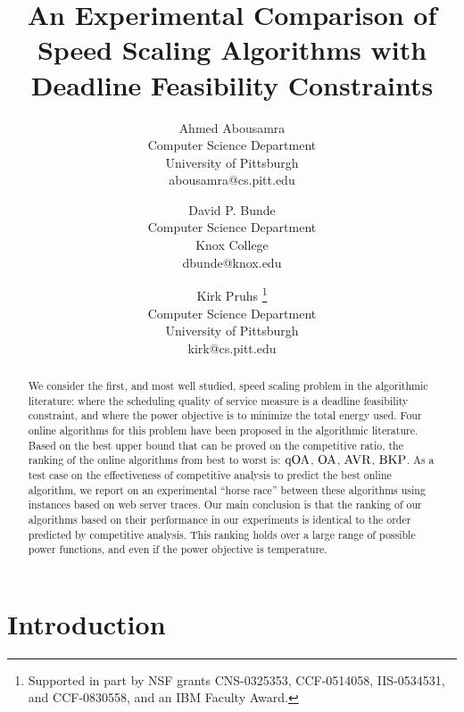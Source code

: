 \documentclass[11pt]{article}
\newcommand{\BKP}{{\rm BKP}}
\newcommand{\AVR}{{\rm AVR}}
\newcommand{\OA}{{\rm OA}}
\newcommand{\qOA}{{\rm qOA}}
\begin{document}
 

\title{An Experimental Comparison of Speed Scaling Algorithms with Deadline Feasibility Constraints}


\author{
Ahmed Abousamra\\
Computer Science Department\\
University of Pittsburgh\\
abousamra@cs.pitt.edu\\
\and
David P. Bunde\\
Computer Science Department\\
Knox College\\
dbunde@knox.edu\\
\and
Kirk Pruhs \thanks{ Supported in part by NSF grants CNS-0325353, CCF-0514058, IIS-0534531, and CCF-0830558, and an IBM Faculty Award.  } \\
Computer Science Department\\
University of Pittsburgh\\
kirk@cs.pitt.edu\\
}

\date{}
\maketitle



\begin{abstract}
We consider the first,
and most well studied, speed scaling problem in the
algorithmic literature:
where the scheduling quality of
service measure is a deadline feasibility constraint,
and where the power
objective is to minimize the total energy used.
Four online algorithms for this problem have been proposed in the
algorithmic literature. 
Based on the best upper bound that can be proved on the competitive ratio,
the ranking of the online algorithms from best
to worst is: $\qOA$, $\OA$, $\AVR$, $\BKP$.
As a test case on the effectiveness of competitive analysis to
predict the best online algorithm,
we report on an experimental ``horse race'' between these algorithms
using instances based on web server traces. 
Our main conclusion is that 
the ranking of our algorithms based on their performance in our experiments is 
identical to the order predicted by
competitive analysis. This ranking holds over a large range of possible
power functions, and even if the power objective is temperature.
\end{abstract} 



\section{Introduction}
\end{document}
